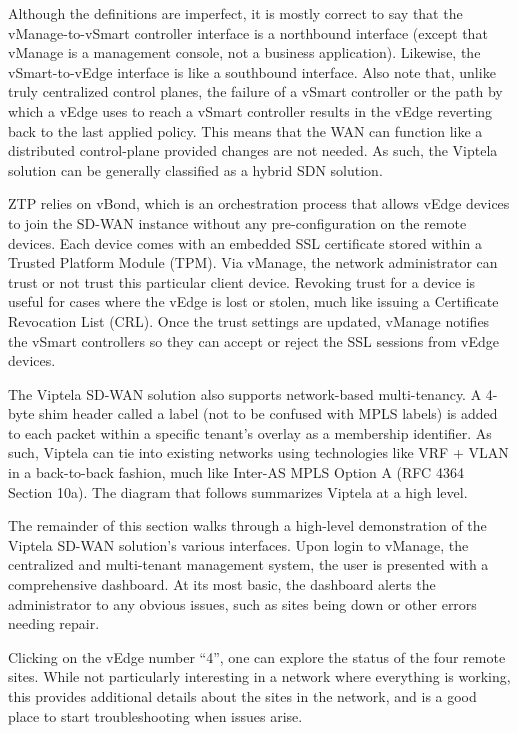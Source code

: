 Although the definitions are imperfect, it is mostly correct to say that the
vManage-to-vSmart controller interface is a northbound interface (except that
vManage is a management console, not a business application). Likewise, the
vSmart-to-vEdge interface is like a southbound interface. Also note that,
unlike truly centralized control planes, the failure of a vSmart controller or
the path by which a vEdge uses to reach a vSmart controller results in the
vEdge reverting back to the last applied policy. This means that the WAN can
function like a distributed control-plane provided changes are not needed. As
such, the Viptela solution can be generally classified as a hybrid SDN solution.

ZTP relies on vBond, which is an orchestration process that allows vEdge
devices to join the SD-WAN instance without any pre-configuration on the
remote devices. Each device comes with an embedded SSL certificate stored
within a Trusted Platform Module (TPM). Via vManage, the network administrator
can trust or not trust this particular client device. Revoking trust for a
device is useful for cases where the vEdge is lost or stolen, much like
issuing a Certificate Revocation List (CRL). Once the trust settings are
updated, vManage notifies the vSmart controllers so they can accept or reject
the SSL sessions from vEdge devices.

The Viptela SD-WAN solution also supports network-based multi-tenancy. A
4-byte shim header called a label (not to be confused with MPLS labels) is
added to each packet within a specific tenant’s overlay as a membership
identifier. As such, Viptela can tie into existing networks using technologies
like VRF + VLAN in a back-to-back fashion, much like Inter-AS MPLS Option A
(RFC 4364 Section 10a). The diagram that follows summarizes Viptela at a high level.


The remainder of this section walks through a high-level demonstration of the
Viptela SD-WAN solution's various interfaces. Upon login to vManage, the
centralized and multi-tenant management system, the user is presented with a
comprehensive dashboard. At its most basic, the dashboard alerts the
administrator to any obvious issues, such as sites being down or other errors
needing repair.


Clicking on the vEdge number ``4'', one can explore the status of the four
remote sites. While not particularly interesting in a network where everything
is working, this provides additional details about the sites in the network,
and is a good place to start troubleshooting when issues arise.

